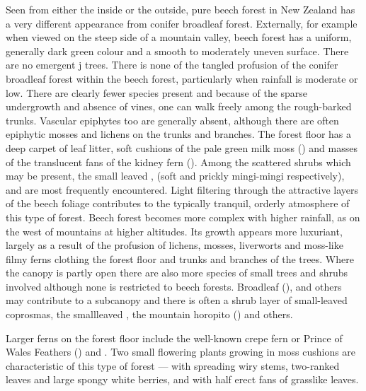 Seen from either the inside or the outside, pure beech forest in New Zealand has a very different appearance from conifer broadleaf forest.
Externally, for example when viewed on the steep side of a mountain valley, beech forest has a uniform, generally dark green colour and a smooth to moderately uneven surface.
There are no emergent j trees.
There is none of the tangled profusion of the conifer broadleaf forest within the beech forest, particularly when rainfall is moderate or low.
There are clearly fewer species present and because of the sparse undergrowth and absence of vines, one can walk freely among the rough-barked trunks.
Vascular epiphytes too are generally absent, although there are often epiphytic mosses and lichens on the trunks and branches.
The forest floor has a deep carpet of leaf litter, soft cushions of the pale green milk moss () and masses of the translucent fans of the kidney fern ().
Among the scattered shrubs which may be present, the small leaved ,  (soft and prickly mingi-mingi respectively),  and  are most frequently encountered.
Light filtering through the attractive layers of the beech foliage contributes to the typically tranquil, orderly atmosphere of this type of forest.
Beech forest becomes more complex with higher rainfall, as on the west of mountains at higher altitudes.
Its growth appears more luxuriant, largely as a result of the profusion of lichens, mosses, liverworts and moss-like filmy ferns clothing the forest floor and trunks and branches of the trees.
Where the canopy is partly open there are also more species of small trees and shrubs involved although none is restricted to beech forests.
Broadleaf (),   and others may contribute to a subcanopy and there is often a shrub layer of small-leaved coprosmas, the smallleaved , the mountain horopito () and others.

Larger ferns on the forest floor include the well-known crepe fern or Prince of Wales Feathers () and .
Two small flowering plants growing in moss cushions are characteristic of this type of forest ---  with spreading wiry stems, two-ranked leaves and large spongy white berries, and  with half erect fans of grasslike leaves.


